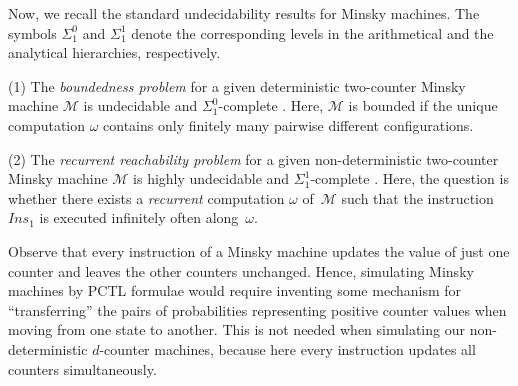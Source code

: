 \documentclass[a4paper,UKenglish,cleveref, autoref, thm-restate]{lipics-v2021}
\newcommand{\M}{\mathcal{M}}
\newcommand{\Ins}{\mathit{Ins}}
\begin{document}
Now, we recall the standard undecidability results for Minsky machines. The symbols $\Sigma_1^0$ and $\Sigma_1^1$ denote the corresponding levels in the arithmetical and the analytical hierarchies, respectively.
\smallskip




(1) The \emph{boundedness problem} for a given deterministic two-counter Minsky machine $\M$ is undecidable and $\Sigma_1^0$-complete \cite{KSCh:Minsky-boundedness-PCS}. Here, $\M$ is bounded if the unique computation $\omega$ contains only finitely many pairwise different configurations.
\smallskip

(2) The \emph{recurrent reachability problem} for a given non-deterministic \mbox{two-counter} Minsky machine $\M$ is highly undecidable and $\Sigma_1^1$-complete \cite{Harel:Infinite-trees-JACM}. Here, the question is whether there exists a \emph{recurrent} computation $\omega$ of~$\M$ such that the instruction $\Ins_1$ is executed infinitely often along~$\omega$.

Observe that every instruction of a Minsky machine updates the value of just one counter and leaves the other counters unchanged. Hence, simulating Minsky machines by PCTL formulae would require inventing some mechanism for ``transferring'' the pairs of probabilities representing positive counter values when moving from one state to another. This is not needed when simulating our non-deterministic $d$-counter machines, because here every instruction updates all counters simultaneously.

\Minsky*
\end{document}
